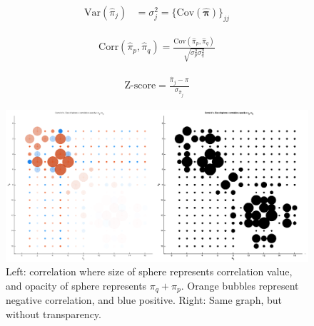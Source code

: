 \documentclass[12pt]{amsart}
\newcommand{\vect}[1]{\boldsymbol{\mathbf{#1}}}
\newcommand{\eqn}[1]{\begin{align*}
#1
\end{align*}}
\newcommand{\Bl}{\Big\{}
\newcommand{\Br}{\Big\}}
\newcommand{\vph}{\hat{\vect{\pi}}}
\begin{document}
\eqn{
	\text{Var}(\hat{\pi}_j) &= \sigma^2_j = \Bl  \text{Cov}(\vph) \Br_{jj}
}

\eqn{
	\text{Corr}(\hat{\pi}_p,\hat{\pi}_q) = \frac{\text{Cov}(\hat{\pi}_p,\hat{\pi}_q)}{\sqrt{\sigma^2_p \sigma^2_q}}
}

\eqn{
	\text{Z-score} = \frac{\hat{\pi}_j - \pi}{\sigma_{\hat{\pi}_j}}
}


\begin{figure}
	
	\begin{center}
		\includegraphics[scale=.75]{correlation_3.png}
	\end{center}
	\caption{Left: correlation where size of sphere represents correlation value, and opacity of sphere represents $\pi_q+\pi_p$. Orange bubbles represent negative correlation, and blue positive. Right: Same graph, but without transparency.}
\end{figure}
\end{document}
